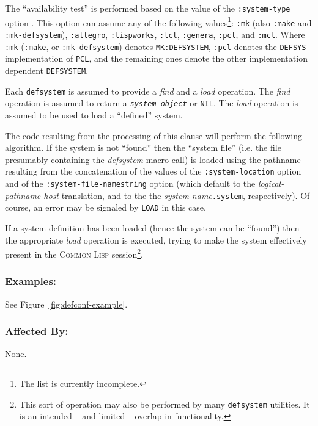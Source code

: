 \documentclass{article}
\newcommand{\CL}{\textsc{Common Lisp}}
\newcommand{\notimpl}{\ddag}
\newcommand{\code}[1]{\texttt{#1}}
\newcommand{\clobject}[1]{\texttt{\textit{#1}}} %
\begin{document}
\begin{description}
	The ``availability test'' is performed based on the value of
	the \code{:system-type} option \notimpl{}.  This option can
	assume any of the following values\footnote{The list is
	currently incomplete.}: \code{:mk} (also \code{:make} and
	\code{:mk-defsystem}), \code{:allegro}, \code{:lispworks},
	\code{:lcl}, \code{:genera}, \code{:pcl}, and \code{:mcl}.
	Where \code{:mk} (\code{:make}, or \code{:mk-defsystem})
	denotes \code{MK:DEFSYSTEM}, \code{:pcl}
	denotes the \code{DEFSYS} implementation of \code{PCL}, and
	the remaining ones denote the other implementation dependent
	\code{DEFSYSTEM}.

	Each \code{defsystem} is assumed to provide a \emph{find} and
	a \emph{load} operation.  The \emph{find} operation is assumed
	to return a \clobject{system object} or \code{NIL}.
	The \emph{load} operation is assumed to be used to load a
	``defined'' system.

	The code resulting from the processing of this clause will
	perform the following algorithm.  If the system is not
	``found'' then the ``system file'' (i.e. the file presumably
	containing the \emph{defsystem} macro call) is loaded using
	the pathname resulting from the concatenation of the values of
	the \code{:system-location} option and of the
	\code{:system-file-namestring} option (which default to the
	\emph{logical-pathname-host} translation, and to the the
	\emph{system-name}\code{.system}, respectively). Of course, an
	error may be signaled by \code{LOAD} in this case.

	If a system definition has been loaded (hence the system can be
	``found'') then the appropriate \emph{load} operation is
	executed, trying to make the system effectively present in the
	\CL{} session\footnote{This sort of operation may also be
	performed by many \code{defsystem} utilities.  It is an
	intended -- and limited -- overlap in functionality.}.
\end{description}

\subsubsection*{Examples:}

See Figure~\ref{fig:defconf-example}.

\subsubsection*{Affected By:}

None.
\end{document}
